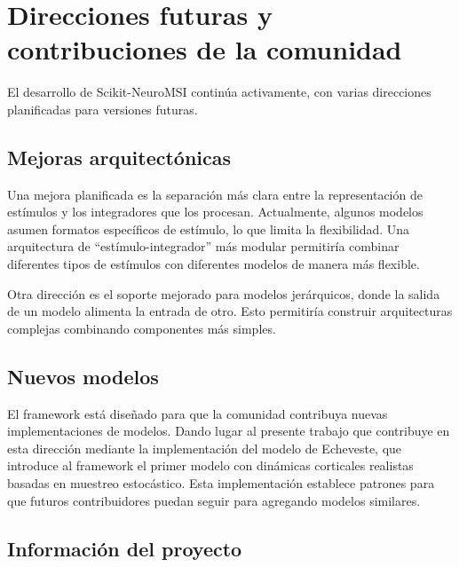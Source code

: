 
\section{Direcciones futuras y contribuciones de la comunidad}
\label{sec:snmsi_futuro}

El desarrollo de Scikit-NeuroMSI continúa activamente, con varias direcciones planificadas para versiones futuras.

\subsection{Mejoras arquitectónicas}
\label{subsec:snmsi_mejoras}

Una mejora planificada es la separación más clara entre la representación de estímulos y los integradores que los procesan. Actualmente, algunos modelos asumen formatos específicos de estímulo, lo que limita la flexibilidad. Una arquitectura de ``estímulo-integrador'' más modular permitiría combinar diferentes tipos de estímulos con diferentes modelos de manera más flexible.

Otra dirección es el soporte mejorado para modelos jerárquicos, donde la salida de un modelo alimenta la entrada de otro. Esto permitiría construir arquitecturas complejas combinando componentes más simples.

\subsection{Nuevos modelos}
\label{subsec:snmsi_nuevos_modelos}

El framework está diseñado para que la comunidad contribuya nuevas implementaciones de modelos. Dando lugar al presente trabajo que contribuye en esta dirección mediante la implementación del modelo de Echeveste, que introduce al framework el primer modelo con dinámicas corticales realistas basadas en muestreo estocástico. Esta implementación establece patrones para que futuros contribuidores puedan seguir para agregando modelos similares.

\subsection{Información del proyecto}
\label{subsec:snmsi_info}

